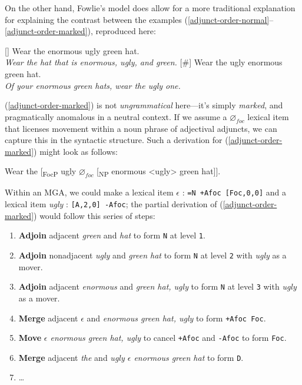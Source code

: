 \documentclass{article}
\begin{document}
On the other hand, Fowlie's model does allow for a more traditional
explanation for explaining the contrast between the examples
(\ref{adjunct-order-normal}--\ref{adjunct-order-marked}), reproduced
here:

\begin{exe}
  []{ Wear the enormous ugly green hat. \\
    \textit{Wear the hat that is enormous, ugly, and green.} }
  [\#]{ Wear the ugly enormous green hat. \\
    \textit{Of your enormous green hats, wear the ugly one.} }
\end{exe}

(\ref{adjunct-order-marked}) is not \emph{ungrammatical} here---it's
simply \emph{marked}, and pragmatically anomalous in a neutral
context.  If we assume a $\varnothing_{foc}$ lexical item that
licenses movement within a noun phrase of adjectival adjuncts, we can
capture this in the syntactic structure.  Such a derivation for
(\ref{adjunct-order-marked}) might look as follows:

\begin{exe}
  \ex Wear the [\textsubscript{FocP} ugly $\varnothing_{foc}$
  [\textsubscript{NP} enormous <ugly> green hat]].
\end{exe}

Within an MGA, we could make a lexical item $\epsilon$ : \texttt{=N
  +Afoc [Foc,0,0]} and a lexical item \textit{ugly} : \texttt{[A,2,0]
  -Afoc}; the partial derivation of (\ref{adjunct-order-marked}) would
follow this series of steps:

\begin{enumerate}
\item \textbf{Adjoin} adjacent \textit{green} and \textit{hat} to form
  \texttt{N} at level \texttt{1}.
\item \textbf{Adjoin} nonadjacent \textit{ugly} and \textit{green hat}
  to form \texttt{N} at level \texttt{2} with \textit{ugly} as a
  mover.
\item \textbf{Adjoin} adjacent \textit{enormous} and \textit{green
    hat, ugly} to form \texttt{N} at level \texttt{3} with
  \textit{ugly} as a mover.
\item \textbf{Merge} adjacent $\epsilon$ and \textit{enormous green
    hat, ugly} to form \texttt{+Afoc Foc}.
\item \textbf{Move} \textit{$\epsilon$ enormous green hat, ugly} to
  cancel \texttt{+Afoc} and \texttt{-Afoc} to form \texttt{Foc}.
\item \textbf{Merge} adjacent \textit{the} and \textit{ugly $\epsilon$
    enormous green hat} to form \texttt{D}.
\item \dots
\end{enumerate}
\end{document}
